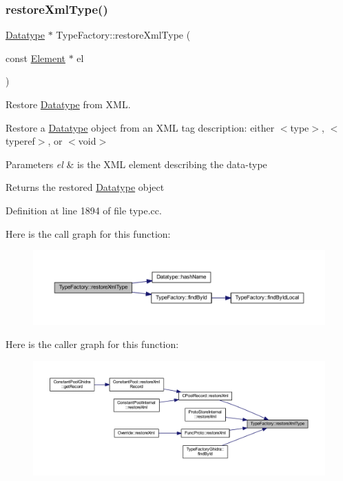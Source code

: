\subsubsection{\texorpdfstring{restoreXmlType()}{restoreXmlType()}}
{\footnotesize\ttfamily \mbox{\hyperlink{class_datatype}{Datatype}} $\ast$ Type\+Factory\+::restore\+Xml\+Type (\begin{DoxyParamCaption}\item[{const \mbox{\hyperlink{class_element}{Element}} $\ast$}]{el }\end{DoxyParamCaption})}



Restore \mbox{\hyperlink{class_datatype}{Datatype}} from X\+ML. 

Restore a \mbox{\hyperlink{class_datatype}{Datatype}} object from an X\+ML tag description\+: either $<$type$>$, $<$typeref$>$, or $<$void$>$ 
\begin{DoxyParams}{Parameters}
{\em el} & is the X\+ML element describing the data-\/type \\
\hline
\end{DoxyParams}
\begin{DoxyReturn}{Returns}
the restored \mbox{\hyperlink{class_datatype}{Datatype}} object 
\end{DoxyReturn}


Definition at line 1894 of file type.\+cc.

Here is the call graph for this function\+:
\nopagebreak
\begin{figure}[H]
\begin{center}
\leavevmode
\includegraphics[width=350pt]{class_type_factory_aea5f4036abb11e63ca5f79a9eacfc93c_cgraph}
\end{center}
\end{figure}
Here is the caller graph for this function\+:
\nopagebreak
\begin{figure}[H]
\begin{center}
\leavevmode
\includegraphics[width=350pt]{class_type_factory_aea5f4036abb11e63ca5f79a9eacfc93c_icgraph}
\end{center}
\end{figure}
\mbox{\label{class_type_factory_a1b1dcb82c1c7493b55aae9b339e909c7}} 
